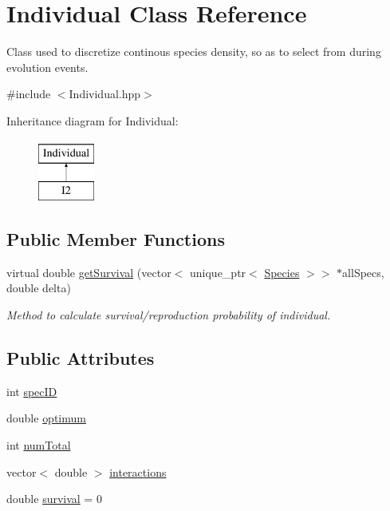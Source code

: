 \hypertarget{classIndividual}{}\section{Individual Class Reference}
\label{classIndividual}


Class used to discretize continous species density, so as to select from during evolution events.  




{\ttfamily \#include $<$Individual.\+hpp$>$}

Inheritance diagram for Individual\+:\begin{figure}[H]
\begin{center}
\leavevmode
\includegraphics[height=2.000000cm]{classIndividual}
\end{center}
\end{figure}
\subsection*{Public Member Functions}
\begin{DoxyCompactItemize}
\item 
virtual double \hyperlink{classIndividual_a895954f2c3a683dd3bd7475651a38160}{get\+Survival} (vector$<$ unique\+\_\+ptr$<$ \hyperlink{classSpecies}{Species} $>$$>$ $\ast$all\+Specs, double delta)
\begin{DoxyCompactList}\small\item\em Method to calculate survival/reproduction probability of individual. \end{DoxyCompactList}\end{DoxyCompactItemize}
\subsection*{Public Attributes}
\begin{DoxyCompactItemize}
\item 
int \hyperlink{classIndividual_a2a7068df27211ad0b2e869a3c628cd9f}{spec\+ID}
\item 
double \hyperlink{classIndividual_adc6dbb93690c48fbba745ce0fcf6d5b0}{optimum}
\item 
int \hyperlink{classIndividual_a78e6327a339aa73f73d81e991b3fede2}{num\+Total}
\item 
vector$<$ double $>$ \hyperlink{classIndividual_ac832077568d1e59f979af3fe6bd7e3e6}{interactions}
\item 
double \hyperlink{classIndividual_adbd7cefa7cf5847a6a20e14c04ab20dd}{survival} = 0
\end{DoxyCompactItemize}


